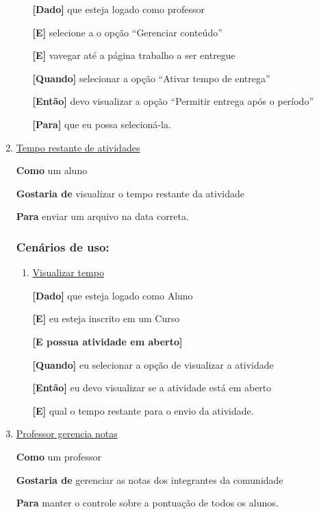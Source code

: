 \begin{enumerate}
\begin{enumerate}
\textbf{[Dado]} que esteja logado como professor

\textbf{[E]} selecione a o opção ``Gerenciar conteúdo''

\textbf{[E]} vavegar até a página trabalho a ser entregue

\textbf{[Quando]} selecionar a opção ``Ativar tempo de entrega''

\textbf{[Então]} devo visualizar a opção ``Permitir entrega após o período''

\textbf{[Para]} que eu possa selecioná-la.

\end{enumerate}
\item \underline{Tempo restante de atividades}

\textbf{Como} um aluno

\textbf{Gostaria de} visualizar o tempo restante da atividade

\textbf{Para} enviar um arquivo na data correta.

\subsubsection*{Cenários de uso:}

\begin{enumerate}
\item \underline{Visualizar tempo}

\textbf{[Dado]} que esteja logado como Aluno

\textbf{[E]} eu esteja inscrito em um Curso

\textbf{[E possua atividade em aberto]}

\textbf{[Quando]} eu selecionar a opção de visualizar a atividade

\textbf{[Então]} eu devo visualizar se a atividade está em aberto

\textbf{[E]} qual o tempo restante para o envio da atividade.

\end{enumerate}

\item \underline{Professor gerencia notas}

\textbf{Como} um professor

\textbf{Gostaria de} gerenciar as notas dos integrantes da comunidade

\textbf{Para} manter o controle sobre a pontuação de todos os alunos.


\end{enumerate}
